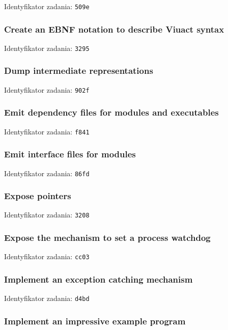 Identyfikator zadania: \texttt{509e}

\subsubsection{Create an EBNF notation to describe Viuact syntax}

Identyfikator zadania: \texttt{3295}

\subsubsection{Dump intermediate representations}

Identyfikator zadania: \texttt{902f}

\subsubsection{Emit dependency files for modules and executables}

Identyfikator zadania: \texttt{f841}

\subsubsection{Emit interface files for modules}

Identyfikator zadania: \texttt{86fd}

\subsubsection{Expose pointers}

Identyfikator zadania: \texttt{3208}

\subsubsection{Expose the mechanism to set a process watchdog}

Identyfikator zadania: \texttt{cc03}

\subsubsection{Implement an exception catching mechanism}

Identyfikator zadania: \texttt{d4bd}

\subsubsection{Implement an impressive example program}

